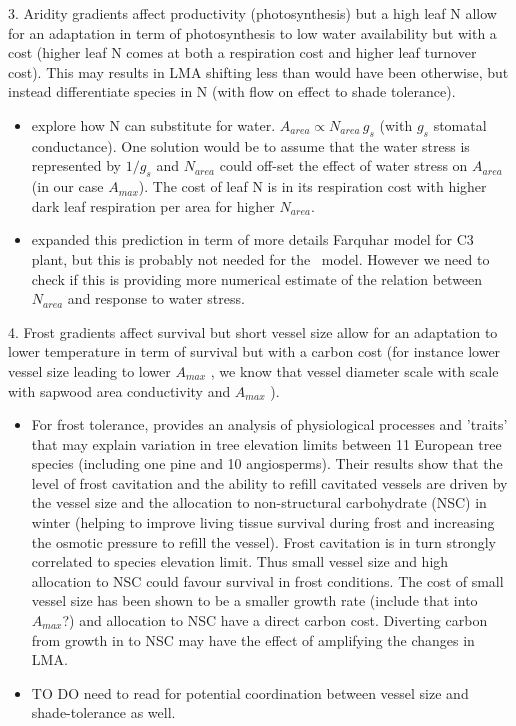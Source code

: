 \documentclass[a4paper,11pt]{article}
\begin{document}
3. Aridity gradients affect productivity (photosynthesis) but a
high leaf N allow for an adaptation in term of photosynthesis to low water availability but with a cost (higher leaf N comes at both a respiration cost and higher leaf turnover cost). This may results in LMA shifting less than would have been otherwise, but  instead differentiate species in N (with flow on effect to shade tolerance).


\begin{itemize}
\item \citet{Wright-2003} explore how N can substitute for water. $A_{area} \propto N_{area} \, g_s$ (with $g_s$ stomatal conductance). One solution would be to assume that the water stress is represented by $1/g_s$ and $N_{area}$ could off-set the effect of water stress on $A_{area}$ (in our case $A_{max}$). The cost of leaf N is in its respiration cost with higher dark leaf respiration per area for higher $N_{area}$.

\item \citet{Prentice-2014} expanded this prediction in term of more details Farquhar model for C3 plant, but this is probably not needed for the \plant\ model. However we need to check if this is providing more numerical estimate of the relation between $N_{area}$ and response to water stress.
\end{itemize}

4. Frost gradients affect survival but
short vessel size allow for an adaptation to lower temperature in term
of survival but
with a carbon cost (for instance lower vessel size leading to lower
$A_{max}$ \citep{Poorter-2010}, we know that vessel diameter scale with scale with sapwood area conductivity and $A_{max}$ \citep{Chen-2009,Choat-2011}).


\begin{itemize}
\item  For frost tolerance, \citet{Charrier-2013} provides an analysis of physiological processes and 'traits' that may explain variation in tree elevation limits between 11 European tree species (including one pine and 10 angiosperms). Their results show that the level of frost cavitation and the ability to refill cavitated vessels are driven by the vessel size and the allocation to non-structural carbohydrate (NSC) in winter (helping to improve living tissue survival during frost and increasing the osmotic pressure to refill the vessel). Frost cavitation is in turn strongly correlated to species elevation limit. Thus small vessel size and high allocation to NSC could favour survival in frost conditions. The cost of small vessel size has been shown to be a smaller growth rate \citep{Poorter-2010} (include that into $A_{max}$?) and allocation to NSC have a direct carbon cost. Diverting carbon from growth in to NSC may have the effect of amplifying the changes in LMA.
\item TO DO need to read \citet{Markesteijn-2011} for potential coordination between vessel size and shade-tolerance as well.
\end{itemize}
\end{document}
